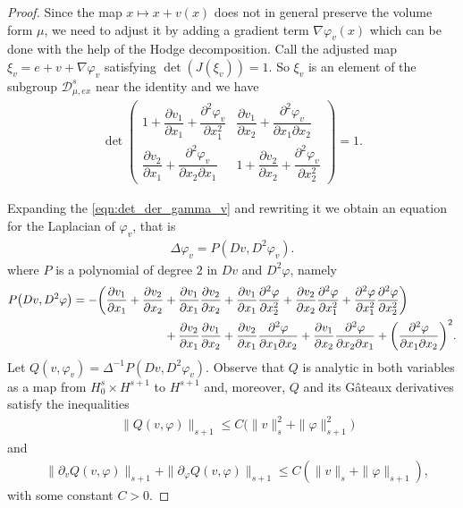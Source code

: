 \documentclass[10pt,a4paper]{amsart}
\begin{document}
\begin{proof}
Since  the map $x\mapsto x+v(x)$ does not in general preserve the volume form $\mu$, we need to adjust it by adding a gradient term $\nabla \varphi_{v}(x)$ which can be done with the help of the Hodge decomposition.
    Call the adjusted map $\xi_v=e+v+\nabla \varphi_{v}$ satisfying $\det (J (\xi_v))=1$. So $\xi_v$ is an element of the subgroup $\mathcal{D}_{\mu, ex}^s$ near the identity and we have
     \begin{align}\label{eqn:det_der_gamma_v}
         \det\begin{pmatrix}
             1+\dfrac{\partial v_1}{\partial x_1}+ \dfrac{\partial^2 \varphi_{v}}{\partial x_1^2} &  \dfrac{\partial v_1}{\partial x_2}+ \dfrac{\partial^2 \varphi_{v}}{\partial x_1 \partial x_2}\\
             \dfrac{\partial v_2}{\partial x_1}+ \dfrac{\partial^2 \varphi_{v}}{\partial x_2 \partial x_1} &  1+\dfrac{\partial v_2}{\partial x_2}+ \dfrac{\partial^2 \varphi_{v}}{\partial x_2^2}
         \end{pmatrix}=1.
     \end{align}

      Expanding the \eqref{eqn:det_der_gamma_v} and rewriting it we obtain an equation for the Laplacian of $\varphi_v$, that is
      \begin{align}\label{eqn:contraction_map}
      	\Delta\varphi_{v}= P(D v,D^2\varphi_{v}).
      \end{align}
  where $P$ is a polynomial of degree $2$ in $Dv$ and $D^2\varphi$, namely 
 \begin{align}
    P\big(D v,D^2\varphi\big)= -\bigg(\frac{\partial v_1}{\partial x_1}+ \frac{\partial v_2}{\partial x_2}
     &+ \frac{\partial v_1}{\partial x_1} \frac{\partial v_2}{\partial x_2}+ \frac{\partial v_1}{\partial x_1} \frac{\partial^2 \varphi}{\partial x_2^2}+ \frac{\partial v_2}{\partial x_2} \frac{\partial^2 \varphi}{\partial x_1^2} + \frac{\partial^2\varphi}{\partial x_1^2}\frac{\partial^2\varphi}{\partial x_2^2} \bigg)\notag\\
     &+  \frac{\partial v_2}{\partial x_1} \frac{\partial v_1}{\partial x_2}  + \frac{\partial v_2}{\partial x_1}  \frac{\partial^2 \varphi}{\partial x_1 \partial x_2}+ \frac{\partial v_1}{\partial x_2} \frac{\partial^2 \varphi}{\partial x_2 \partial x_1} + \bigg(\frac{\partial^2 \varphi}{\partial x_1 \partial x_2}\bigg)^2.
 \end{align}
 Let $Q(v,\varphi_{v})=  	\Delta^{-1} P(D v,D^2\varphi_{v})$.
Observe that $Q$ is analytic in both variables as a map from $H_0^s\times H^{s+1}$ to $H^{s+1}$ and, moreover, $Q$ and its G\^ateaux derivatives satisfy the inequalities
\begin{align}\label{eqn:bound_Q}
    &\|Q(v,\varphi)\|_{s+1}\le C\big(\|v\|_s^2+\|\varphi\|_{s+1}^2\big) 
\end{align}
and
\begin{align}\label{eqn:bound_nabla_Q}
    &\|\partial_vQ(v,\varphi)\|_{s+1}+\|\partial_{\varphi} Q(v,\varphi)\|_{s+1}\le C(\|v\|_s+\|\varphi\|_{s+1}),
\end{align}
with some constant $C>0$. 


\end{proof}
\end{document}
